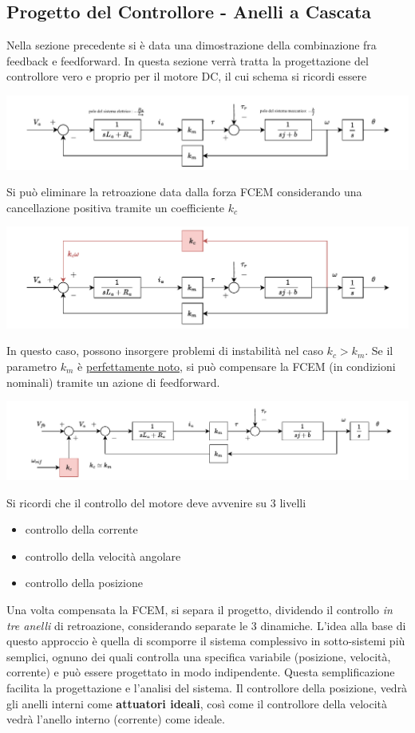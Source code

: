 \documentclass[10pt, letterpaper]{report}
\begin{document}
\subsection{Progetto del Controllore - Anelli a Cascata}
Nella sezione precedente si è data una dimostrazione della combinazione fra feedback e feedforward. In questa sezione verrà tratta la progettazione del controllore vero e proprio per il motore DC, il cui schema si ricordi essere
\begin{center}
    \includegraphics[width=1\textwidth ]{images/schemaBlocchiMotoreDc.pdf}
\end{center}
Si può eliminare la retroazione data dalla forza FCEM considerando una cancellazione positiva tramite un coefficiente $k_c$
\begin{center}
    \includegraphics[width=1\textwidth ]{images/schemaBlocchiMotoreDc2.pdf}
\end{center}
In questo caso, possono insorgere problemi di instabilità nel caso $k_c>k_m$. Se il parametro $k_m$ è \underline{perfettamente noto}, si può compensare la FCEM (in condizioni nominali) tramite un azione di feedforward.
\begin{center}
    \includegraphics[width=1\textwidth ]{images/schemaBlocchiMotoreDc3.pdf}
\end{center}
Si ricordi che il controllo del motore deve avvenire su 3 livelli\begin{itemize}
    \item controllo della corrente 
    \item controllo della velocità angolare 
    \item controllo della posizione 
\end{itemize}
Una volta compensata la FCEM, si separa il progetto, dividendo il controllo \textit{in tre anelli} di retroazione, considerando separate le 3 dinamiche.
\acc 
L'idea alla base di questo approccio è quella di scomporre il sistema complessivo in sotto-sistemi più semplici, ognuno dei quali controlla una specifica variabile (posizione, velocità, corrente) e può essere progettato in modo indipendente. Questa semplificazione facilita la progettazione e l'analisi del sistema.\acc 
Il controllore della posizione, vedrà gli anelli interni come \textbf{attuatori ideali}, così come il controllore della velocità vedrà l'anello interno (corrente) come ideale. 
\end{document}
